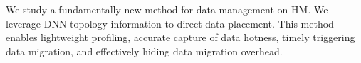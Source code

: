 We study a fundamentally new method for data management on HM. %
We %
\textcolor{check}{leverage DNN topology information }to direct data placement. This method enables lightweight profiling, accurate capture of data hotness, timely triggering data migration, and effectively hiding data migration overhead. 





\begin{comment}
For instance, multi-GPU systems have been explored
when the batch and model parameters do not fit in the memory of a single GPU. The solution has been to reduce the batch size and make it fit in memory. But this changes the batch size and alters the convergence
\end{comment}